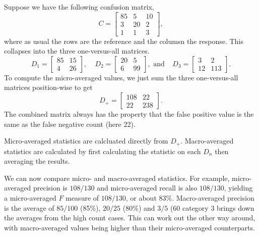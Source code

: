 Suppose we have the following confusion matrix, 
%
\begin{equation}
C = 
\left[
\begin{array}{ccc}
85 & 5 & 10
\\ 
3  & 20 & 2
\\ 
1  & 1  & 3
\end{array}
\right],
\end{equation}
%
where as usual the rows are the reference and the columsn the response.
This collapses into the three one-versus-all matrices.  
%
\begin{equation}
%
D_1 = \left[ 
\begin{array}{cc}
85 & 15 \\
 4 & 26
\end{array}
\right],
%
\ \ \ \ \
%
D_2 = \left[ 
\begin{array}{cc}
20 & 5 \\
 6 & 99
\end{array}
\right], \mbox{ and}
%
\ \ \ \ \
%
D_3 = \left[ 
\begin{array}{cc}
 3 & 2 \\
 12 & 113
\end{array}
\right].
%
\end{equation}
%
To compute the micro-averaged values, we just sum the three one-versus-all
matrices position-wise to get
%
\begin{equation}
D_+ = \left[ 
\begin{array}{cc}
108 & 22 \\
22 & 238
\end{array}
\right].
\end{equation}
%
The combined matrix always has the property that the false positive
value is the same as the false negative count (here 22).  


Micro-averaged statistics are calcluated directly from $D_+$.
Macro-averaged statistics are calculated by first calculating
the statistic on each $D_n$ then averaging the results.

We can now compare micro- and macro-averaged statistics.  For example,
micro-averaged precision is $108/130$ and micro-averaged recall is
also $108/130$, yielding a micro-averaged $F$ measure of $108/130$, or
about 83\%.  Macro-averaged precision is the average of $85/100$
(85\%), $20/25$ (80\%) and $3/5$ (60%
category 3 brings down the averages from the high count cases.  This
can work out the other way around, with macro-averaged values being
higher than their micro-averaged counterparts.



